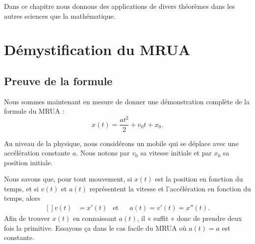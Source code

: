 
Dans ce chapitre nous donnons des applications de divers théorèmes dans les autres sciences que la mathématique.

\section{Démystification du MRUA}
\label{SecMRUAsecondeGGdQoT}

\subsection{Preuve de la formule}

Nous sommes maintenant en mesure de donner une démonstration complète de la formule du MRUA :
\begin{equation}    \label{EqMRUAINT}
	x(t) = \frac{ at^2 }{ 2 } + v_0t +x_0.
\end{equation}

Au niveau de la physique, nous considérons un mobile qui se déplace avec une accélération constante \( a\). Nous notons par \( v_0\) sa vitesse initiale et par \( x_0\) sa position initiale.

Nous savons que, pour tout mouvement, si \( x(t)\) est la position en fonction du temps, et si \( v(t)\) et \( a(t)\) représentent la vitesse et l'accélération en fonction du temps, alors
\begin{equation}
	\begin{aligned}[]
		v(t) & =x'(t) & \text{et} &  & a(t)=v'(t)=x''(t).
	\end{aligned}
\end{equation}
Afin de trouver \( x(t)\) en connaissant \( a(t)\), il « suffit » donc de prendre deux fois la primitive. Essayons ça dans le cas facile du MRUA où \( a(t)=a\) est constante.

